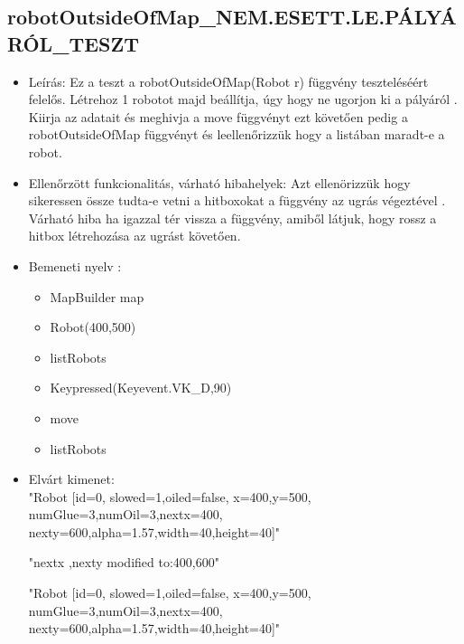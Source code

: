 \subsection{robotOutsideOfMap\_NEM.ESETT.LE.PÁLYÁRÓL\_TESZT}
\begin{itemize}
	\item Leírás: Ez a teszt a robotOutsideOfMap(Robot r) függvény teszteléséért felelős.
			Létrehoz 1 robotot majd beállítja, úgy hogy ne ugorjon ki a pályáról .
			Kiirja az adatait  és meghivja a move függvényt ezt követően pedig a robotOutsideOfMap függvényt és leellenőrizzük hogy a listában maradt-e             a robot.\newline
	\item Ellenőrzött funkcionalitás, várható hibahelyek: Azt ellenörizzük hogy sikeressen össze tudta-e vetni a hitboxokat a függvény az ugrás                     végeztével .
	        Várható hiba ha igazzal tér vissza a függvény, amiből látjuk, hogy rossz a hitbox létrehozása  az ugrást követően.
	\item Bemeneti nyelv :
		\begin{itemize}
\item MapBuilder map
		\item Robot(400,500)
		\item listRobots
		\item Keypressed(Keyevent.VK\_D,90)
		\item move
		\item listRobots
		\end{itemize}

	\item Elvárt kimenet: \\
		"Robot [id=0,  slowed=1,oiled=false, x=400,y=500, 
		\\numGlue=3,numOil=3,nextx=400,
		\\nexty=600,alpha=1.57,width=40,height=40]"\newline
		
		"nextx ,nexty modified to:400,600"\newline

	
		 "Robot [id=0,  slowed=1,oiled=false, x=400,y=500, 
		\\numGlue=3,numOil=3,nextx=400,
		\\nexty=600,alpha=1.57,width=40,height=40]"\newline
	
\end{itemize}

\pagebreak
